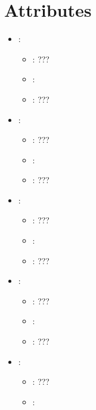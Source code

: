 \section{Attributes}


\begin{itemize}
    \item {}:
           \begin{itemize}
                \item \optionPossibleValues{}: ???
                \item \optionDefaultValue{}: 
                \item \optionDescrption{}: ???
           \end{itemize}
    \item {}:
           \begin{itemize}
                \item \optionPossibleValues{}: ???
                \item \optionDefaultValue{}: 
                \item \optionDescrption{}: ???
           \end{itemize}
    \item {}:
           \begin{itemize}
                \item \optionPossibleValues{}: ???
                \item \optionDefaultValue{}: 
                \item \optionDescrption{}: ???
           \end{itemize}
    \item {}:
           \begin{itemize}
                \item \optionPossibleValues{}: ???
                \item \optionDefaultValue{}: 
                \item \optionDescrption{}: ???
           \end{itemize}
    \item {}:
           \begin{itemize}
                \item \optionPossibleValues{}: ???
                \item \optionDefaultValue{}: 

\end{itemize}
\end{itemize}
